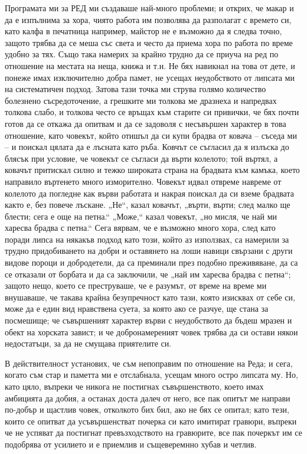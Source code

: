 \documentclass[12pt]{book}
\begin{document}
Програмата ми за РЕД ми създаваше най-много проблеми; и открих, че макар и да е изпълнима за хора, чиято работа им позволява да разполагат с времето си, като калфа в печатница например, майстор не е възможно да я следва точно, защото трябва да се меша със света и често да приема хора по работа по време удобно за тях. Също така намерих за крайно трудно да се приуча на ред по отношение на местата на неща, книжа и т.н. Не бях навикнал на това от дете, и понеже имах изключително добра памет, не усещах неудобството от липсата ми на систематичен подход. Затова тази точка ми струва голямо количество болезнено съсредоточение, а грешките ми толкова ме дразнеха и напредвах толкова слабо, и толкова често се връщах към старите си привички, че бях почти готов да се откажа да опитвам и да се задоволя с несъвършен характер в това отношение, като човекът, който отишъл да си купи брадва от ковача – съседа ми – и поискал цялата да е лъсната като ръба. Ковчът се съгласил да я излъска до блясък при условие, че човекът се съгласи да върти колелото; той въртял, а ковачът притискал силно и тежко широката страна на брадвата към камъка, което направило въртенето много изморително. Човекът идвал отвреме навреме от колелото да погледне как върви работата и накрая поискал да си вземе брадвата както е, без повече лъскане. „Не“, казал ковачът, „върти, върти; след малко ще блести; сега е още на петна.“ „Може,“ казал човекът, „но мисля, че най ми харесва брадва с петна.“ Сега вярвам, че е възможно много хора, след като поради липса на някакъв подход като този, който аз използвах, са намерили за трудно придобиването на добри и оставянето на лоши навици свързани с други видове пороци и добродетели, да са преминали през подобно преживяване, да са се отказали от борбата и да са заключили, че „най им харесва брадва с петна“; защото нещо, което се преструваше, че е разумът, от време на време ми внушаваше, че такава крайна безупречност като тази, която изисквах от себе си, може да е един вид нравствена суета, за която ако се разчуе, ще стана за посмешище; че съвършеният характер върви с неудобството да бъдеш мразен и обект на хорската завист; и че добронамереният човек трябва да си остави някои недостатъци, за да не смущава приятелите си.

В действителност установих, че съм непоправим по отношение на Реда; и сега, когато съм стар и паметта ми е отслабнала, усещам много остро липсата му. Но, като цяло, въпреки че никога не постигнах съвършенството, което имах амбицията да добия, а останах доста далеч от него, все пак опитът ме направи по-добър и щастлив човек, отколкото бих бил, ако не бях се опитал; като тези, които се опитват да усъвършенстват почерка си като имитират гравюри, въпреки че не успяват да постигнат превъзходството на гравюрите, все пак почеркът им се подобрява от усилието и е приемлив и същеверемнно хубав и четлив.
\end{document}
